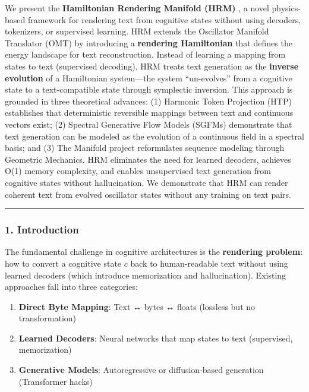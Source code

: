\documentclass[
  11pt,
  a4paper,
]{article}
\providecommand{\tightlist}{%
  \setlength{\itemsep}{0pt}\setlength{\parskip}{0pt}}
\begin{document}
We present the \textbf{Hamiltonian Rendering Manifold (HRM)} , a novel
physics-based framework for rendering text from cognitive states without
using decoders, tokenizers, or supervised learning. HRM extends the
Oscillator Manifold Translator (OMT) by introducing a \textbf{rendering
Hamiltonian} that defines the energy landscape for text reconstruction.
Instead of learning a mapping from states to text (supervised decoding),
HRM treats text generation as the \textbf{inverse evolution} of a
Hamiltonian system---the system ``un-evolves'' from a cognitive state to
a text-compatible state through symplectic inversion. This approach is
grounded in three theoretical advances: (1) Harmonic Token Projection
(HTP) establishes that deterministic reversible mappings between text
and continuous vectors exist; (2) Spectral Generative Flow Models
(SGFMs) demonstrate that text generation can be modeled as the evolution
of a continuous field in a spectral basis; and (3) The Manifold project
reformulates sequence modeling through Geometric Mechanics. HRM
eliminates the need for learned decoders, achieves O(1) memory
complexity, and enables unsupervised text generation from cognitive
states without hallucination. We demonstrate that HRM can render
coherent text from evolved oscillator states without any training on
text pairs.

\begin{center}\rule{0.5\linewidth}{0.5pt}\end{center}

\subsubsection{1. Introduction}\label{introduction-5}

The fundamental challenge in cognitive architectures is the
\textbf{rendering problem}: how to convert a cognitive state \(c\) back
to human-readable text without using learned decoders (which introduce
memorization and hallucination). Existing approaches fall into three
categories:

\begin{enumerate}
\def\labelenumi{\arabic{enumi}.}
\tightlist
\item
  \textbf{Direct Byte Mapping}: Text ↔ bytes ↔ floats (lossless but no
  transformation)
\item
  \textbf{Learned Decoders}: Neural networks that map states to text
  (supervised, memorization)
\item
  \textbf{Generative Models}: Autoregressive or diffusion-based
  generation (Transformer hacks)
\end{enumerate}
\end{document}
